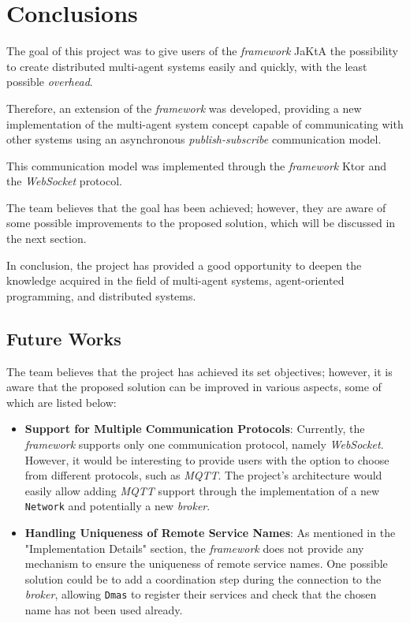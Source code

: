 \section{Conclusions}
The goal of this project was to give users of the \textit{framework} JaKtA the possibility to create distributed multi-agent systems easily and quickly, with the least possible \textit{overhead}.

Therefore, an extension of the \textit{framework} was developed, providing a new implementation of the multi-agent system concept capable of communicating with other systems using an asynchronous \textit{publish-subscribe} communication model.

This communication model was implemented through the \textit{framework} Ktor and the \textit{WebSocket} protocol.

The team believes that the goal has been achieved; however, they are aware of some possible improvements to the proposed solution, which will be discussed in the next section.

In conclusion, the project has provided a good opportunity to deepen the knowledge acquired in the field of multi-agent systems, agent-oriented programming, and distributed systems.


\subsection{Future Works}
The team believes that the project has achieved its set objectives; however, it is aware that the proposed solution can be improved in various aspects, some of which are listed below:
\begin{itemize}
    \item \textbf{Support for Multiple Communication Protocols}: Currently, the \textit{framework} supports only one communication protocol, namely \textit{WebSocket}. However, it would be interesting
    to provide users with the option to choose from different protocols, such as \textit{MQTT}.
    The project's architecture would easily allow adding \textit{MQTT} support through the implementation of a new \texttt{Network} and potentially a new \textit{broker}.
    \item \textbf{Handling Uniqueness of Remote Service Names}: As mentioned in the "Implementation Details" section, the \textit{framework} does not provide any mechanism to ensure
    the uniqueness of remote service names.
    One possible solution could be to add a coordination step during the connection to the \textit{broker}, allowing \texttt{Dmas} to register their services and check that the chosen name has not been used already.
\end{itemize}
